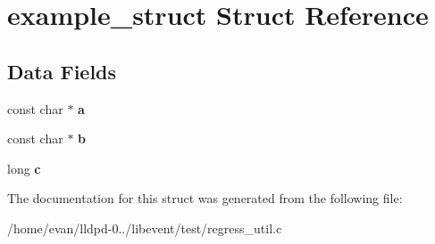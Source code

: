 \section{example\-\_\-struct \-Struct \-Reference}
\label{structexample__struct}
\subsection*{\-Data \-Fields}
\begin{DoxyCompactItemize}
\item 
const char $\ast$ {\bfseries a}\label{structexample__struct_a4cd038d7f17e31f35a991f6456fbc34d}

\item 
const char $\ast$ {\bfseries b}\label{structexample__struct_a0a667482238bcca3ac201c1cd09c5072}

\item 
long {\bfseries c}\label{structexample__struct_aefebb2d9a7e0f437715d386ce76a67aa}

\end{DoxyCompactItemize}


\-The documentation for this struct was generated from the following file\-:\begin{DoxyCompactItemize}
\item 
/home/evan/lldpd-\/0../libevent/test/regress\-\_\-util.\-c\end{DoxyCompactItemize}
